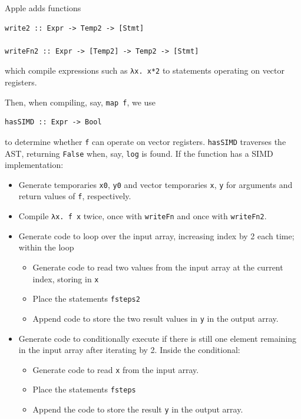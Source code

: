 \documentclass{article}
\begin{document}
Apple adds functions

\begin{verbatim}
write2 :: Expr -> Temp2 -> [Stmt]

writeFn2 :: Expr -> [Temp2] -> Temp2 -> [Stmt]
\end{verbatim}

which compile expressions such as \verb|λx. x*2| to statements operating on vector registers.

Then, when compiling, say, \verb|map f|, we use

\begin{verbatim}
hasSIMD :: Expr -> Bool
\end{verbatim}

to determine whether \verb|f| can operate on vector registers. \verb|hasSIMD| traverses the AST, returning \verb|False| when, say, \verb|log| is found. If the function has a SIMD implementation:

\begin{itemize}
  \item Generate temporaries \verb|x0|, \verb|y0| and vector temporaries \verb|x|, \verb|y| for arguments and return values of \verb|f|, respectively.
  \item Compile \verb|λx. f x| twice, once with \verb|writeFn| and once with \verb|writeFn2|.
  \item Generate code to loop over the input array, increasing index by 2 each time; within the loop
    \begin{itemize}
      \item Generate code to read two values from the input array at the current index, storing in \verb|x|
      \item Place the statements \verb|fsteps2|
      \item Append code to store the two result values in \verb|y| in the output array.
    \end{itemize}
  \item Generate code to conditionally execute if there is still one element remaining in the input array after iterating by 2. Inside the conditional:
    \begin{itemize}
      \item Generate code to read \verb|x| from the input array.
      \item Place the statements \verb|fsteps|
      \item Append the code to store the result \verb|y| in the output array.
    \end{itemize}
\end{itemize}
\end{document}
